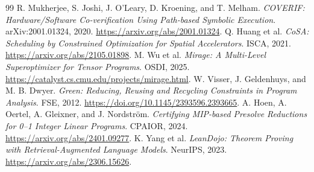 \documentclass[11pt]{article}
\begin{document}
\begin{thebibliography}{99}
 R. Mukherjee, S. Joshi, J. O'Leary, D. Kroening, and T. Melham. \emph{COVERIF: Hardware/Software Co-verification Using Path-based Symbolic Execution}. arXiv:2001.01324, 2020. \url{https://arxiv.org/abs/2001.01324}.
 Q. Huang et al. \emph{CoSA: Scheduling by Constrained Optimization for Spatial Accelerators}. ISCA, 2021. \url{https://arxiv.org/abs/2105.01898}.
 M. Wu et al. \emph{Mirage: A Multi-Level Superoptimizer for Tensor Programs}. OSDI, 2025. \url{https://catalyst.cs.cmu.edu/projects/mirage.html}.
 W. Visser, J. Geldenhuys, and M. B. Dwyer. \emph{Green: Reducing, Reusing and Recycling Constraints in Program Analysis}. FSE, 2012. \url{https://doi.org/10.1145/2393596.2393665}.
 A. Hoen, A. Oertel, A. Gleixner, and J. Nordstr\"om. \emph{Certifying MIP-based Presolve Reductions for 0--1 Integer Linear Programs}. CPAIOR, 2024. \url{https://arxiv.org/abs/2401.09277}.
 K. Yang et al. \emph{LeanDojo: Theorem Proving with Retrieval-Augmented Language Models}. NeurIPS, 2023. \url{https://arxiv.org/abs/2306.15626}.
\end{thebibliography}
\end{document}
